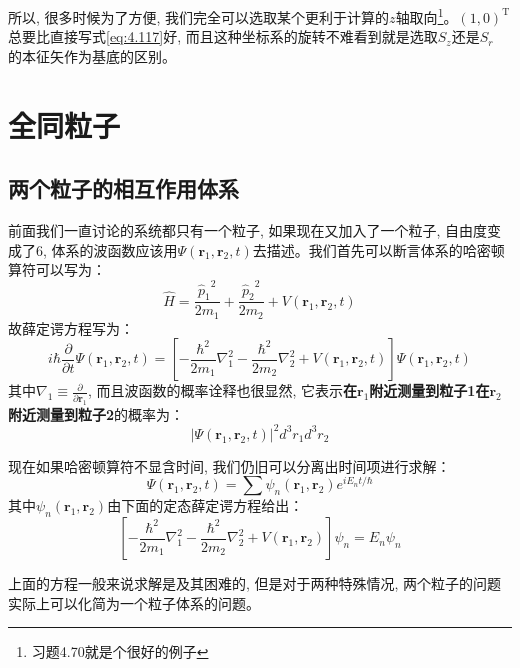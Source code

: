 \documentclass[a4paper,zihao=-4,linespread=1]{ctexrep}
\begin{document}
    所以, 很多时候为了方便, 我们完全可以选取某个更利于计算的$z$轴取向\footnote{习题4.70就是个很好的例子}。$(1,0)^\mathrm{T}$总要比直接写式\ref{eq:4.117}好, 而且这种坐标系的旋转不难看到就是选取$S_z$还是$S_r$
    的本征矢作为基底的区别。

    \chapter{全同粒子}
    \section{两个粒子的相互作用体系}
    前面我们一直讨论的系统都只有一个粒子, 如果现在又加入了一个粒子, 自由度变成了$6$, 体系的波函数应该用$\Psi(\mathbf{r}_1,\mathbf{r}_2,t)$去描述。我们首先可以断言体系的哈密顿算符可以写为：
    \[\hat{H}=\frac{{\hat{p}_1}^2}{2m_1}+\frac{{\hat{p}_2}^2}{2m_2}+V(\mathbf{r}_1,\mathbf{r}_2,t)\]
    故薛定谔方程写为：
    \begin{equation}
        i\hbar\frac{\partial }{\partial t}\Psi(\mathbf{r}_1,\mathbf{r}_2,t)=\left[-\frac{\hbar^2}{2m_1}\nabla_1^2-\frac{\hbar^2}{2m_2}\nabla_2^2+V(\mathbf{r}_1,\mathbf{r}_2,t)\right]\Psi(\mathbf{r}_1,\mathbf{r}_2,t)
    \end{equation}
    其中$\nabla_1\equiv\frac{\partial}{\partial\mathbf{r}_1}$, 而且波函数的概率诠释也很显然, 它表示\textbf{在$\mathbf{r}_1$附近测量到粒子1在$\mathbf{r}_2$附近测量到粒子2}的概率为：
    \begin{equation}
        \left|\Psi(\mathbf{r}_1,\mathbf{r}_2,t)\right|^2d^3r_1d^3r_2
    \end{equation}
    
    现在如果哈密顿算符不显含时间, 我们仍旧可以分离出时间项进行求解：
    \[\Psi(\mathbf{r}_1,\mathbf{r}_2,t)=\sum\psi_n(\mathbf{r}_1,\mathbf{r}_2)e^{iE_nt/\hbar}\]
    其中$\psi_n(\mathbf{r}_1,\mathbf{r}_2)$由下面的定态薛定谔方程给出：
    \begin{equation}
        \label{eq:5.3}
        \left[-\frac{\hbar^2}{2m_1}\nabla_1^2-\frac{\hbar^2}{2m_2}\nabla_2^2+V(\mathbf{r}_1,\mathbf{r}_2)\right]\psi_n=E_n\psi_n
    \end{equation}
    
    上面的方程一般来说求解是及其困难的, 但是对于两种特殊情况, 两个粒子的问题实际上可以化简为一个粒子体系的问题。
\end{document}
